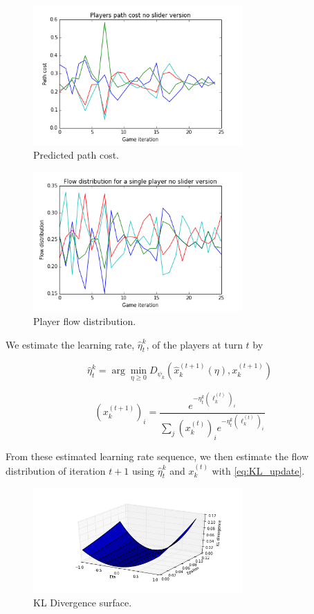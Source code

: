 \documentclass{sig-alternate-ipsn13}
\begin{document}
\begin{figure}
  \centering
  \includegraphics[width=80mm]{images/no_slider_path_costs.png}
  \caption{Predicted path cost.}
  \label{fig:predicted_path_cost}
\end{figure}


\begin{figure}
  \centering
  \includegraphics[width=80mm]{images/no_slider_actual_flow_distribution.png}
  \caption{Player flow distribution.}
  \label{fig:no_slider_player_flow_distribution}
\end{figure}

We estimate the learning rate, $\hat \eta^k_t$,  of the players at turn $t$ by

\[
  \hat \eta^k_t = \arg\min_{\eta \geq 0} D_{\psi_k}(\hat x_k^{(t+1)}(\eta), x^{(t+1)}_k)
\]



\begin{equation} \label{eq:KL_update}
  (x_k^{(t+1)})_i = \frac{e^{-\eta_t^k (\ell^{(t)}_k)_i}}{\sum_j (x_k^{(t)})_i e^{-\eta_t^k (\ell^{(t)}_k)_i}}
\end{equation}


From these estimated learning rate sequence, we then estimate the flow distribution of iteration $t+1$ using $\hat \eta^k_t $ and $x_k^{(t)}$ with \ref{eq:KL_update}.


\begin{figure}
  \centering
  \includegraphics[width=80mm]{images/no_slider_KL_divergence_surface.png}
  \caption{KL Divergence surface.}
  \label{fig:kl_divergence_surface}
\end{figure}
\end{document}
